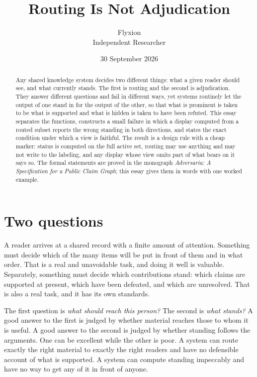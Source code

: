 \documentclass[11pt]{article}
\title{Routing Is Not Adjudication}
\author{Flyxion\\\small Independent Researcher}
\date{30 September 2026}
\begin{document}
\maketitle

\begin{abstract}
\noindent
Any shared knowledge system decides two different things: what a given reader should see, and what currently stands. The first is routing and the second is adjudication. They answer different questions and fail in different ways, yet systems routinely let the output of one stand in for the output of the other, so that what is prominent is taken to be what is supported and what is hidden is taken to have been refuted. This essay separates the functions, constructs a small failure in which a display computed from a routed subset reports the wrong standing in both directions, and states the exact condition under which a view is faithful. The result is a design rule with a cheap marker: status is computed on the full active set, routing may use anything and may not write to the labeling, and any display whose view omits part of what bears on it says so. The formal statements are proved in the monograph \emph{Adversaria: A Specification for a Public Claim Graph}; this essay gives them in words with one worked example.
\end{abstract}

\section{Two questions}

A reader arrives at a shared record with a finite amount of attention. Something must decide which of the many items will be put in front of them and in what order. That is a real and unavoidable task, and doing it well is valuable. Separately, something must decide which contributions stand: which claims are supported at present, which have been defeated, and which are unresolved. That is also a real task, and it has its own standards.

The first question is \emph{what should reach this person?} The second is \emph{what stands?} A good answer to the first is judged by whether material reaches those to whom it is useful. A good answer to the second is judged by whether standing follows the arguments. One can be excellent while the other is poor. A system can route exactly the right material to exactly the right readers and have no defensible account of what is supported. A system can compute standing impeccably and have no way to get any of it in front of anyone.
\end{document}
